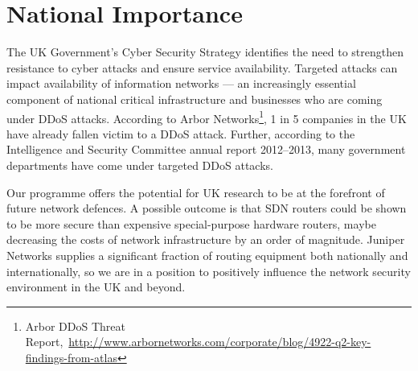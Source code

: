\section{National Importance}
The UK Government's Cyber Security Strategy identifies the need to
strengthen resistance to cyber attacks and ensure service
availability. Targeted attacks can impact availability of information
networks --- an increasingly essential component of national critical
infrastructure and businesses who are coming under DDoS attacks.
According to Arbor Networks\footnote{Arbor DDoS Threat
  Report,~\url{http://www.arbornetworks.com/corporate/blog/4922-q2-key-findings-from-atlas}},
1 in 5 companies in the UK have already fallen victim to a DDoS
attack. Further, according to the Intelligence and Security Committee
annual report 2012--2013, many government departments have come under
targeted DDoS attacks.


Our programme offers the potential for UK research to be at the
forefront of future network defences. A possible outcome is that SDN
routers could be shown to be more secure than expensive
special-purpose hardware routers, maybe decreasing the costs of
network infrastructure by an order of magnitude.  Juniper Networks
supplies a significant fraction of routing equipment both nationally and
internationally, so we are in a position to positively influence
the network security environment in the UK and beyond.




